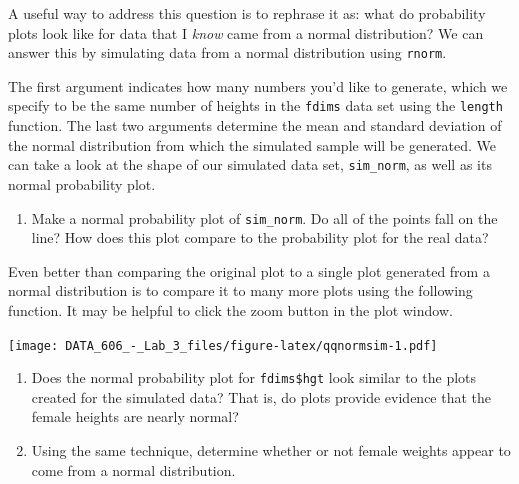 \documentclass[]{article}
\newenvironment{Shaded}{\begin{snugshade}}{\end{snugshade}}
\newcommand{\KeywordTok}[1]{\textcolor[rgb]{0.13,0.29,0.53}{\textbf{{#1}}}}
\newcommand{\DataTypeTok}[1]{\textcolor[rgb]{0.13,0.29,0.53}{{#1}}}
\newcommand{\StringTok}[1]{\textcolor[rgb]{0.31,0.60,0.02}{{#1}}}
\newcommand{\NormalTok}[1]{{#1}}
\providecommand{\tightlist}{%
  \setlength{\itemsep}{0pt}\setlength{\parskip}{0pt}}
\begin{document}
A useful way to address this question is to rephrase it as: what do
probability plots look like for data that I \emph{know} came from a
normal distribution? We can answer this by simulating data from a normal
distribution using \texttt{rnorm}.

\begin{Shaded}
\end{Shaded}

The first argument indicates how many numbers you'd like to generate,
which we specify to be the same number of heights in the \texttt{fdims}
data set using the \texttt{length} function. The last two arguments
determine the mean and standard deviation of the normal distribution
from which the simulated sample will be generated. We can take a look at
the shape of our simulated data set, \texttt{sim\_norm}, as well as its
normal probability plot.

\begin{enumerate}
\def\labelenumi{\arabic{enumi}.}
\setcounter{enumi}{2}
\tightlist
\item
  Make a normal probability plot of \texttt{sim\_norm}. Do all of the
  points fall on the line? How does this plot compare to the probability
  plot for the real data?
\end{enumerate}

Even better than comparing the original plot to a single plot generated
from a normal distribution is to compare it to many more plots using the
following function. It may be helpful to click the zoom button in the
plot window.

\begin{Shaded}
\end{Shaded}

\texttt{[image: DATA\_606\_-\_Lab\_3\_files/figure-latex/qqnormsim-1.pdf]}

\begin{enumerate}
\def\labelenumi{\arabic{enumi}.}
\setcounter{enumi}{3}
\item
  Does the normal probability plot for \texttt{fdims\$hgt} look similar
  to the plots created for the simulated data? That is, do plots provide
  evidence that the female heights are nearly normal?
\item
  Using the same technique, determine whether or not female weights
  appear to come from a normal distribution.
\end{enumerate}
\end{document}
